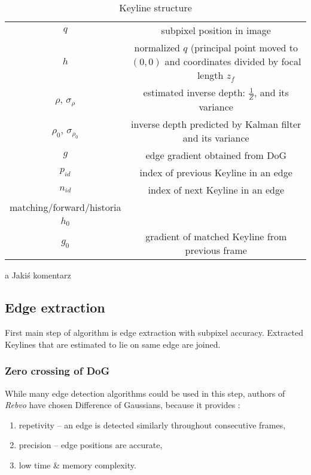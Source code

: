 \begin{table}[h]
	\centering
	
	\begin{threeparttable}
		\caption{Keyline structure}
		\label{tab:keyline}
		
		\begin{tabularx}{0.6\textwidth}{C{1} C{1}}
			\toprule
			 &  \\
			\midrule
			$q$ & subpixel position in image \\
			$h$ & normalized $q$ (principal point moved to $(0,0)$ and coordinates divided by focal length $z_f$ \\
			$\rho$, $\sigma_{\rho}$ & estimated inverse depth: $\frac{1}{Z}$, and its variance \\
			$\rho_0$, $\sigma_{\rho_{0}}$ & inverse depth predicted by Kalman filter and its variance \\
			$g$ & edge gradient obtained from DoG \\
			$p_{id}$ & index of previous Keyline in an edge \\
			$n_{id}$ & index of next Keyline in an edge \\
			
			matching/forward/historia \\
			$h_0$ &  \\
			$g_{0}$ & gradient of matched Keyline from previous frame \\
			\bottomrule
		\end{tabularx}
		
		\begin{tablenotes}
			\footnotesize
			\item[a] Jakiś komentarz\textellipsis
		\end{tablenotes}
		
	\end{threeparttable}
\end{table}


\subsection{Edge extraction}

First main step of algorithm is edge extraction with subpixel accuracy. Extracted Keylines that are estimated to lie on same edge are joined.

\subsubsection{Zero crossing of DoG}
While many edge detection algorithms could be used in this step, authors of \textit{Rebvo} have chosen Difference of Gaussians, because it provides \cite{jose2015realtime}:
\begin{enumerate}
	\item repetivity -- an edge is detected similarly throughout consecutive frames,
	\item precision -- edge positions are accurate,
	\item low time \& memory complexity.
\end{enumerate}

